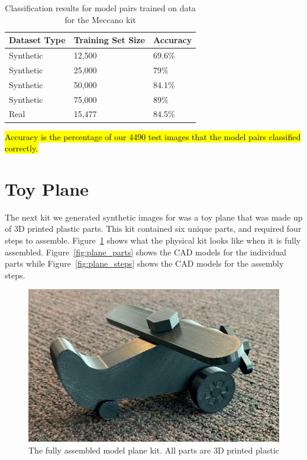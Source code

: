 \begin{table}
\begin{tabular}{|l||l|l|}
\hline
  Dataset Type & Training Set Size & Accuracy\\
  \hline
  \hline
  Synthetic & 12,500 & 69.6\%\\
  Synthetic & 25,000 & 79\%\\
  Synthetic & 50,000 & 84.1\%\\
  Synthetic & 75,000 & 89\%\\
  \hline
  Real & 15,477 & 84.5\%\\
\hline
\end{tabular}
\begin{captiontext}
    \hl{Accuracy is the percentage of our 4490 test images that the model pairs
    classified correctly.}
  \end{captiontext}
  \caption{
    Classification results for model pairs trained on data for the Meccano kit
  }\label{tab:meccano_accuracy}
\end{table}

\section{Toy Plane}

The next kit we generated synthetic images for was a toy plane that was made up
of 3D printed plastic parts.
This kit contained six unique parts, and required four steps to assemble.
Figure~\ref{fig:assembled_plane} shows what the physical kit looks like when it
is fully assembled.
Figure~\ref{fig:plane_parts} shows the CAD models for the individual parts while
Figure~\ref{fig:plane_steps} shows the CAD models for the assembly steps.

\begin{figure}
  \includegraphics[width=\columnwidth]{figures/synthetic/toy_plane.jpg}
  \caption{
    The fully assembled model plane kit. All parts are 3D printed plastic
  }\label{fig:assembled_plane}
\end{figure}

